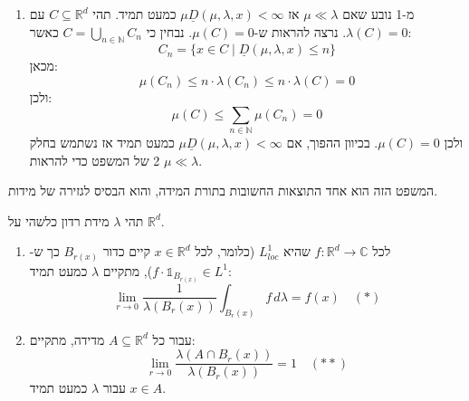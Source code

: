\documentclass{tstextbook}
\begin{document}
\begin{enumerate}
  \item מ-1 נובע שאם \(\mu \ll \lambda\) אז \(\underline{D}(\mu, \lambda, x) < \infty\)\(\mu\) כמעט תמיד. תהי \(C \subseteq \mathbb{R}^d\) עם \(\lambda(C) = 0\). נרצה להראות ש-\(\mu(C) = 0\). נבחין כי \(C = \bigcup_{n \in \mathbb{N}} C_n\) כאשר: 
$$ C_n = \{x \in C \mid \underline{D}(\mu, \lambda, x) \leq n\} $$
מכאן:
$$ \mu(C_n) \leq n \cdot \lambda(C_n) \leq n \cdot \lambda(C) = 0 $$
ולכן:
$$ \mu(C) \leq \sum_{n \in \mathbb{N}} \mu(C_n) = 0$$
ולכן \(\mu(C) = 0\). בכיוון ההפוך, אם \(\underline{D}(\mu, \lambda, x) < \infty\)\(\mu\) כמעט תמיד אז נשתמש בחלק 2 של המשפט כדי להראות \(\mu \ll \lambda\).


\end{enumerate}
\begin{remark}
המשפט הזה הוא אחד התוצאות החשובות בתורת המידה, והוא הבסיס לגזירה של מידות.

\end{remark}
\begin{corollary}
תהי \(\lambda\) מידת רדון כלשהי על \(\mathbb{R}^d\).

  \begin{enumerate}
    \item לכל \(f: \mathbb{R}^d \to \mathbb{C}\) שהיא \(L^1_{loc}\) (כלומר, לכל \(x \in \mathbb{R}^d\) קיים כדור \(B_{r(x)}\) כך ש-\(f \cdot \mathbb{1}_{B_{r(x)}} \in L^1\)), מתקיים \(\lambda\) כמעט תמיד: 
$$ \lim_{r \to 0} \frac{1}{\lambda(B_r(x))} \int_{B_r(x)} f \, d\lambda = f(x) \quad (*) $$


    \item עבור כל \(A \subseteq \mathbb{R}^d\) מדידה, מתקיים: 
$$ \lim_{r \to 0} \frac{\lambda(A \cap B_r(x))}{\lambda(B_r(x))} = 1 \quad (**) $$
עבור \(\lambda\) כמעט תמיד \(x \in A\).


  \end{enumerate}
\end{corollary}
\end{document}
